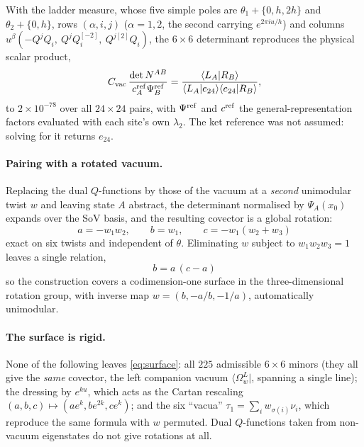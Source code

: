 \documentclass[11pt]{article}
\newcommand{\bra}[1]{\langle #1|}
\begin{document}
With the ladder measure, whose five simple poles are $\theta_1+\{0,h,2h\}$ and $\theta_2+\{0,h\}$,
rows $(\alpha,i,j)$ ($\alpha=1,2$, the second carrying $e^{2\pi iu/h}$) and columns
$u^\beta(-Q^jQ_i,\ Q^jQ_i^{[-2]},\ Q^{j[2]}Q_i)$, the $6\times6$ determinant reproduces the
physical scalar product,
\begin{equation}
C_{\rm vac}\,\frac{\det N^{AB}}{c^{\rm ref}_A\Psi^{\rm ref}_B}
=\frac{\langle L_A|R_B\rangle}{\langle L_A|e_{24}\rangle\langle e_{24}|R_B\rangle},
\end{equation}
to $2\times10^{-78}$ over all $24\times24$ pairs, with $\Psi^{\rm ref}$ and $c^{\rm ref}$ the
general-representation factors evaluated with each site's own $\lambda_2$. The ket reference was
not assumed: solving for it returns $e_{24}$.

\paragraph{Pairing with a rotated vacuum.} Replacing the dual $Q$-functions by those of the vacuum
at a \emph{second} unimodular twist $w$ and leaving state $A$ abstract, the determinant normalised
by $\Psi_A(x_0)$ expands over the SoV basis, and the resulting covector is a global rotation:
\begin{equation}
\boxed{\;a=-w_1w_2,\qquad b=w_1,\qquad c=-w_1(w_2+w_3)\;}
\end{equation}
exact on six twists and independent of $\theta$. Eliminating $w$ subject to $w_1w_2w_3=1$ leaves a
single relation,
\begin{equation}
\boxed{\;b=a\,(c-a)\;}
\label{eq:surface}
\end{equation}
so the construction covers a codimension-one surface in the three-dimensional rotation group, with
inverse map $w=(b,-a/b,-1/a)$, automatically unimodular.

\paragraph{The surface is rigid.} None of the following leaves \eqref{eq:surface}:
all $225$ admissible $6\times6$ minors (they all give the \emph{same} covector, the left companion
vacuum $\bra{\Omega^L_w}$, spanning a single line); the dressing by $e^{ku}$, which acts as the
Cartan rescaling $(a,b,c)\mapsto(ae^{k},be^{2k},ce^{k})$; and the six ``vacua''
$\tau_1=\sum_i w_{\sigma(i)}\nu_i$, which reproduce the same formula with $w$ permuted. Dual
$Q$-functions taken from non-vacuum eigenstates do not give rotations at all.
\end{document}
